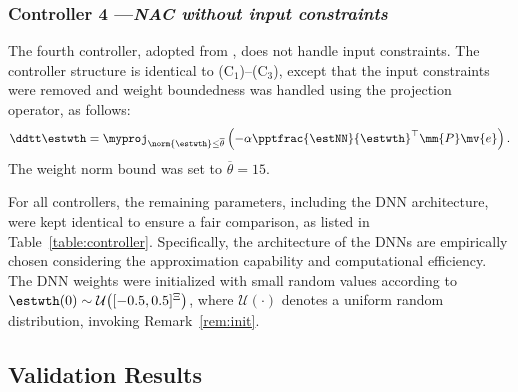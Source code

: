 \documentclass[letterpaper, journal]{IEEEtran}
\begin{document}
\subsubsection*{Controller 4 —\textit{NAC without input constraints}}

The fourth controller, adopted from \cite{Patil:2022aa}, does not handle input constraints.
The controller structure is identical to (C$_1$)--(C$_3$), except that the input constraints were removed and weight boundedness was handled using the projection operator, as follows:
\begin{equation}
    \ddtt\estwth
    =
    \myproj_{\norm{\estwth}\le\overline{\theta}}
    \left(
        -\alpha
        \pptfrac{\estNN}{\estwth}^\top
        \mm{P}
        \mv{e}
    \right)
    .
\end{equation}
The weight norm bound was set to $\overline{\theta}=15$.

\hfill

For all controllers, the remaining parameters, including the DNN architecture, were kept identical to ensure a fair comparison, as listed in Table~\ref{table:controller}.
Specifically, the architecture of the DNNs are empirically chosen considering the approximation capability and computational efficiency.
The DNN weights were initialized with small random values according to $\estwth(0)\sim\mathcal{U}\bigl([-0.5,0.5]^{\Xi}\bigr)$, where $\mathcal{U}(\cdot)$ denotes a uniform random distribution, invoking Remark~\ref{rem:init}.

\subsection{Validation Results} \label{sec:val:results}
\end{document}
